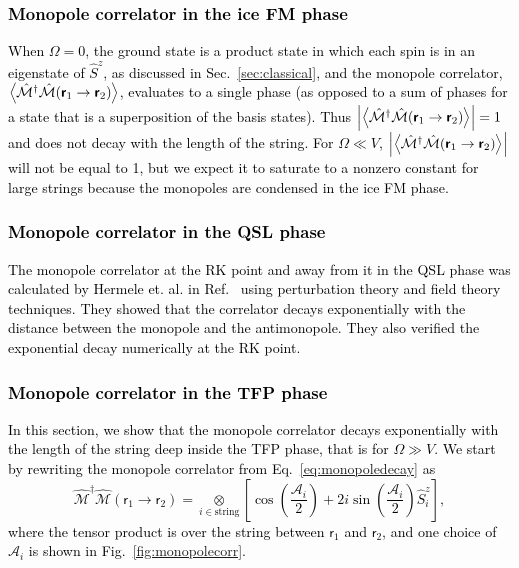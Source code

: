 \documentclass[twocolumn,superscriptaddress,amsmath,amssymb,aps,prx,nofootinbib]{revtex4-2}
\newcommand{\dual}[1]{\boldsymbol{\mathsf{#1}}}
\newcommand{\newtext}[1]{\textcolor{black}{#1}}
\begin{document}
\newtext{\subsubsection{Monopole correlator in the ice FM phase}} \label{sec:monopole_corr_ice_fm}

\newtext{When $\Omega = 0$, the ground state is a product state in which each spin is in an eigenstate of $\hat{S}^z$, as discussed in Sec.~\ref{sec:classical}, and the monopole correlator, $\expval{\hat{\mathcal{M}}^\dagger \hat{\mathcal{M}} (\dual{r}_1 \rightarrow \dual{r}_2) }$, evaluates to a single phase (as opposed to a sum of phases for a state that is a superposition of the basis states). Thus $\abs{\expval{\hat{\mathcal{M}}^\dagger \hat{\mathcal{M}} (\dual{r}_1 \rightarrow \dual{r}_2) }} = 1$ and does not decay with the length of the string. For $\Omega \ll V$, $\abs{ \expval{\hat{\mathcal{M}}^\dagger \hat{\mathcal{M}} (\dual{r}_1 \rightarrow \dual{r}_2) }} $ will not be equal to 1, but we expect it to saturate to a nonzero constant for large strings  because the monopoles are condensed in the ice FM phase. }

\newtext{\subsubsection{Monopole correlator in the QSL phase}}
\label{sec:monopole_corr_qsl}

\newtext{The monopole correlator at the RK point and away from it in the QSL phase was calculated by Hermele et. al. in Ref.~\cite{hermele2004} using perturbation theory and field theory techniques. They showed that the correlator decays exponentially with the distance between the monopole and the antimonopole. They also verified the exponential decay numerically at the RK point.}

\newtext{\subsubsection{Monopole correlator in the TFP phase}}
\label{sec:monopole_corr_tfp}

\newtext{In this section, we show that the monopole correlator decays exponentially with the length of the string deep inside the TFP phase, that is for $\Omega \gg V$. We start by rewriting the monopole correlator from Eq.~\eqref{eq:monopoledecay} as
\begin{equation}
    \label{eq:monopoledecay2}
        \hat{\mathcal{M}}^\dagger \hat{\mathcal{M}} (\dual{r}_1\rightarrow \dual{r}_2)=  \underset{i \in \text{string}}{\otimes} \left[ \cos\left( \frac{\mathcal{A}_{i}}{2} \right) + 2i  \sin\left( \frac{\mathcal{A}_{i}}{2} \right) \hat{S}^z_{i} \right],
\end{equation}
where the tensor product is over the string between $\dual{r}_1$ and $\dual{r}_2$, and one choice of $\mathcal{A}_i$ is shown in Fig.~\ref{fig:monopolecorr}.}
\end{document}
